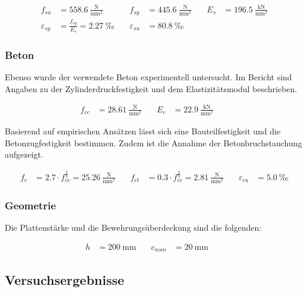 \documentclass[
  11pt,
  letterpaper,
]{scrreprt}
\begin{document}
\[
\begin{aligned}
f_{su}& = 558.6 \ \frac{\mathrm{N}}{\mathrm{mm}^{2}} \quad & f_{sy}& = 445.6 \ \frac{\mathrm{N}}{\mathrm{mm}^{2}} \quad & E_{s}& = 196.5 \ \frac{\mathrm{kN}}{\mathrm{mm}^{2}} \\ 
\varepsilon_{sy}& = \frac{f_{sy}}{E_{s}} = 2.27 \ \mathrm{‰} \quad & \varepsilon_{su}& = 80.8 \ \mathrm{‰} \quad &  
 \end{aligned}
\]

\subsubsection{Beton}\label{beton}

Ebenso wurde der verwendete Beton experimentell untersucht. Im Bericht
sind Angaben zu der Zylinderdruckfestigkeit und dem Elastizitätsmodul
beschrieben.

\[
\begin{aligned}
f_{cc}& = 28.61 \ \frac{\mathrm{N}}{\mathrm{mm}^{2}} \quad & E_{c}& = 22.9 \ \frac{\mathrm{kN}}{\mathrm{mm}^{2}} \quad &  
 \end{aligned}
\]

Basierend auf empirischen Ansätzen lässt sich eine Bauteilfestigkeit und
die Betonzugfestigkeit bestimmen. Zudem ist die Annahme der
Betonbruchstauchung aufgezeigt.

\[
\begin{aligned}
f_{c}& = 2.7 \cdot f_{cc}^{\frac{2}{3}} = 25.26 \ \frac{\mathrm{N}}{\mathrm{mm}^{2}} \quad & f_{ct}& = 0.3 \cdot f_{cc}^{\frac{2}{3}} = 2.81 \ \frac{\mathrm{N}}{\mathrm{mm}^{2}} \quad & \varepsilon_{cu}& = 5.0 \ \mathrm{‰} \end{aligned}
\]

\subsubsection{Geometrie}\label{geometrie}

Die Plattenstärke und die Bewehrungsüberdeckung sind die folgenden:

\[
\begin{aligned}
h& = 200 \ \mathrm{mm} \quad & c_{nom}& = 20 \ \mathrm{mm} \quad &  
 \end{aligned}
\]

\subsection{Versuchsergebnisse}\label{versuchsergebnisse}
\end{document}
